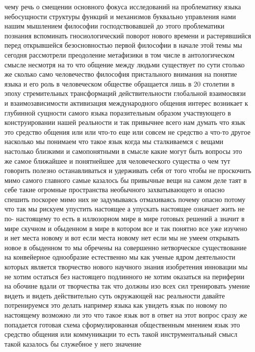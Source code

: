 чему речь о смещении основного фокуса исследований на проблематику языка
небосущности структуры функций и механизмов буквально управления нами нашим
мышлением философии господствовавшей до этого проблематики познания вспоминать
гносиологический поворот нового времени и растерявшийся перед открывшейся
безосновностью первой философии в начале этой темы мы сегодня рассмотрели
преодоление метафизики в том числе в антологическом смысле несмотря на то что
общение между людьми существует по сути столько же сколько само человечество
философия пристального внимания на понятие языка и его роль в человеческом
обществе обращается лишь в 20 столетии в эпоху стремительных трансформаций
действительности глобальной взаимосвязи и взаимозависимости активизация
международного общения интерес возникает к глубинной сущности самого языка
поразительным образом участвующего в конструировании нашей реальности и так
привычнее всего нам думать что язык это средство общения или или что-то еще или
совсем не средство а что-то другое насколько мы понимаем что такое язык когда мы
сталкиваемся с вещами настолько близкими и самопонятными в смысле какие могут
быть вопросы это же самое ближайшее и понятнейшее для человеческого существа о
чем тут говорить полезно останавливаться и удерживать себя от того чтобы не
проскочить мимо самого главного самые казалось бы привычные вещи на самом деле
таят в себе такие огромные пространства необычного захватывающего и опасно
спешить поскорее мимо них не задумываясь отмахиваясь почему опасно потому что
так мы рискуем упустить настоящее а упускать настоящее означает жить не по-
настоящему то есть в иллюзорном мире в мире готовых решений а значит в мире
скучном и обыденном в мире в котором все и так понятно все уже изучено и нет
места новому и вот если места новому нет если мы не умеем открывать новое в
обыденном то мы обречены на совершенно нетворческое существование на конвейерное
однообразие естественно мы как ученые ядром деятельности которых является
творчество нового научного знания изобретения инновации мы не хотим остаться без
настоящего подлинного не хотим оказаться на периферии на обочине вдали от
творчества так что должны изо всех сил тренировать умение видеть и видеть
действительно суть окружающей нас реальности давайте потренируемся это делать
например языка как увидеть язык по новому по настоящему возможно ли это что
такое язык вот в ответ на этот вопрос сразу же попадается готовая схема
сформулированная общественным мнением язык это средство общения или коммуникации
то есть такой инструментальный смысл такой казалось бы служебное у него значение
